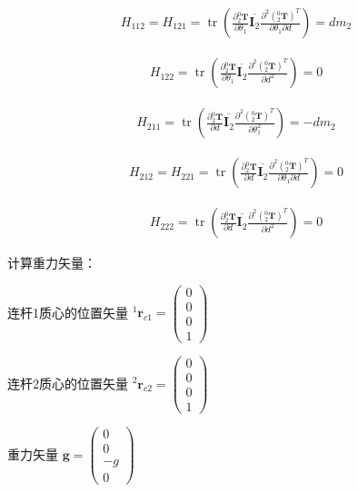 \documentclass{homework}
\begin{document}
\begin{sol}
\begin{align*}
  H_{112} = H_{121} = \operatorname{tr} (\frac{\partial {^0_2}\mathbf{T}}{\partial \theta_1} \overline{\mathbf{I}_2} \frac{\partial^2 ({^0_2}\mathbf{T})^T}{\partial \theta_1 \partial d}) 
                    = d m_2 
\end{align*}

\begin{align*}
  H_{122} = \operatorname{tr} (\frac{\partial {^0_2}\mathbf{T}}{\partial \theta_1} \overline{\mathbf{I}_2} \frac{\partial^2 ({^0_2}\mathbf{T})^T}{\partial d^2}) 
          = 0
\end{align*}

\begin{align*}
  H_{211} = \operatorname{tr} (\frac{\partial {^0_2}\mathbf{T}}{\partial d} \overline{\mathbf{I}_2} \frac{\partial^2 ({^0_2}\mathbf{T})^T}{\partial \theta_1^2}) 
          = -d m_2
\end{align*}

\begin{align*}
  H_{212} = H_{221} = \operatorname{tr} (\frac{\partial {^0_2}\mathbf{T}}{\partial d} \overline{\mathbf{I}_2} \frac{\partial^2 ({^0_2}\mathbf{T})^T}{\partial \theta_1 \partial d}) 
                    = 0
\end{align*}

\begin{align*}
  H_{222} = \operatorname{tr} (\frac{\partial {^0_2}\mathbf{T}}{\partial d} \overline{\mathbf{I}_2} \frac{\partial^2 ({^0_2}\mathbf{T})^T}{\partial d^2}) 
          = 0
\end{align*}

计算重力矢量：

连杆1质心的位置矢量 $ {^1}\mathbf{r}_{c1} = \begin{pmatrix}
    0 \\
    0 \\
    0 \\
    1
  \end{pmatrix} $ 

连杆2质心的位置矢量 $ {^2}\mathbf{r}_{c2} = \begin{pmatrix}
    0 \\
    0 \\
    0 \\
    1
  \end{pmatrix} $ 

重力矢量 $ \mathbf{g} = \begin{pmatrix}
    0 \\
    0 \\
    -g \\
    0
  \end{pmatrix} $


\end{sol}
\end{document}
